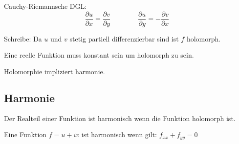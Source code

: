 \documentclass[10pt,a4paper]{article}
\begin{document}
Cauchy-Riemannsche DGL:
\[
\frac{\partial u}{\partial x} = \frac{\partial v}{\partial y}
\,\,\,\,\,\,\,\,\,\,\,\,\,\,\,\,\,\,\,\,\,\,\,\,
\frac{\partial u}{\partial y} = - \frac{\partial v}{\partial x}
\]

Schreibe: Da $u$ und $v$ stetig partiell differenzierbar sind ist $f$ holomorph.

Eine reelle Funktion muss konstant sein um holomorph zu sein.

Holomorphie impliziert harmonie.

\subsection{Harmonie}
Der Realteil einer Funktion ist harmonisch wenn die Funktion holomorph ist.

Eine Funktion $f=u + iv$ ist harmonisch wenn gilt: $f_{xx} + f_{yy} = 0$
\end{document}
